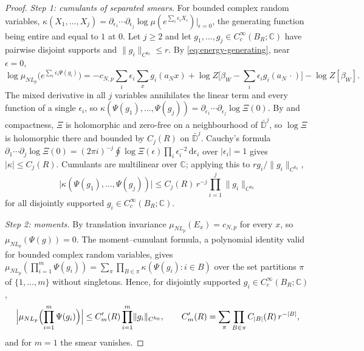 \documentclass[11pt,a4paper]{amsart}
\theoremstyle{definition}
\theoremstyle{remark}
\numberwithin{equation}{section}
\newcommand{\C}{\mathbb{C}}          %
\newcommand{\norm}[1]{\lVert #1\rVert}     %
\newcommand{\abs}[1]{\lvert #1\rvert}      %
\newcommand{\dd}{\,\mathrm{d}}             %
\newcommand{\San}{\text{\upshape(S$'_{\mathrm{an}}$)}} %
\newcommand{\aN}{a_N}                      %
\newcommand{\Lp}{L_p}                      %
\newcommand{\betaW}{\beta_{W}}             %
\begin{document}
\begin{proof}
\emph{Step 1: cumulants of separated smears.} For bounded complex random variables, $\kappa(X_1,\dots,X_j)=\partial_{\epsilon_1}\cdots\partial_{\epsilon_j}\log\mu(e^{\sum_i\epsilon_iX_i})|_{\epsilon=0}$, the generating function being entire and equal to $1$ at $0$. Let $j\ge2$ and let $g_1,\dots,g_j\in C^\infty_c(B_R;\C)$ have pairwise disjoint supports and $\norm{g_i}_{C^{k_0}}\le r$. By \eqref{eq:energy-generating}, near $\epsilon=0$,
\[
\log\mu_{N\Lp}\bigl(e^{\sum_i\epsilon_i\Psi(g_i)}\bigr)=-c_{N,p}\sum_i\epsilon_i\sum_xg_i(\aN x)+\log Z\bigl[\betaW-\textstyle\sum_i\epsilon_ig_i(\aN\,\cdot)\bigr]-\log Z[\betaW].
\]
The mixed derivative in all $j$ variables annihilates the linear term and every function of a single $\epsilon_i$, so $\kappa(\Psi(g_1),\dots,\Psi(g_j))=\partial_{\epsilon_1}\cdots\partial_{\epsilon_j}\log\Xi(0)$. By \San{} and compactness, $\Xi$ is holomorphic and zero-free on a neighbourhood of $\bar{\mathbb D}^j$, so $\log\Xi$ is holomorphic there and bounded by $C_j(R)$ on $\bar{\mathbb D}^j$. Cauchy's formula $\partial_1\cdots\partial_j\log\Xi(0)=(2\pi i)^{-j}\oint\log\Xi(\epsilon)\prod_i\epsilon_i^{-2}\dd\epsilon_i$ over $\abs{\epsilon_i}=1$ gives $\abs{\kappa}\le C_j(R)$. Cumulants are multilinear over $\C$; applying this to $rg_i/\norm{g_i}_{C^{k_0}}$,
\[
\abs{\kappa(\Psi(g_1),\dots,\Psi(g_j))}\le C_j(R)\,r^{-j}\prod_{i=1}^j\norm{g_i}_{C^{k_0}}
\]
for all disjointly supported $g_i\in C^\infty_c(B_R;\C)$.

\emph{Step 2: moments.} By translation invariance $\mu_{N\Lp}(E_x)=c_{N,p}$ for every $x$, so $\mu_{N\Lp}(\Psi(g))=0$. The moment--cumulant formula, a polynomial identity valid for bounded complex random variables, gives $\mu_{N\Lp}(\prod_{i=1}^m\Psi(g_i))=\sum_\pi\prod_{B\in\pi}\kappa(\Psi(g_i):i\in B)$ over the set partitions $\pi$ of $\{1,\dots,m\}$ without singletons. Hence, for disjointly supported $g_i\in C^\infty_c(B_R;\C)$,
\[
\Bigl\lvert\mu_{N\Lp}\Bigl(\prod_{i=1}^m\Psi(g_i)\Bigr)\Bigr\rvert\le C'_m(R)\prod_{i=1}^m\norm{g_i}_{C^{k_0}},\qquad C'_m(R)=\sum_\pi\prod_{B\in\pi}C_{\abs{B}}(R)\,r^{-\abs{B}},
\]
and for $m=1$ the smear vanishes.


\end{proof}
\end{document}
